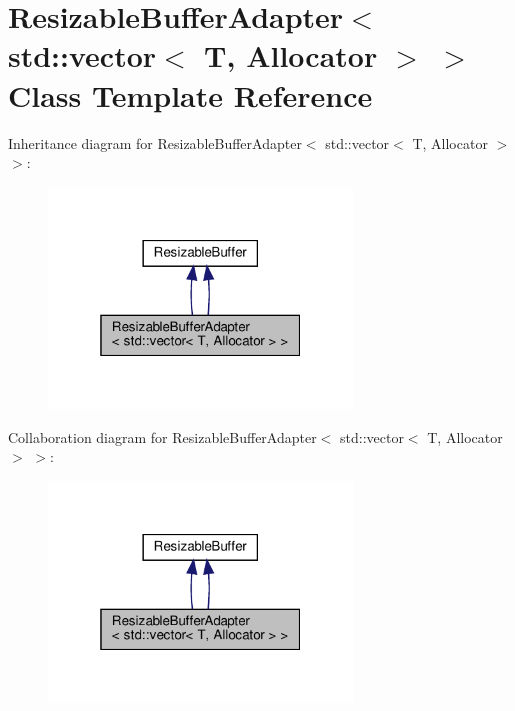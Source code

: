 \hypertarget{classResizableBufferAdapter_3_01std_1_1vector_3_01T_00_01Allocator_01_4_01_4}{}\section{Resizable\+Buffer\+Adapter$<$ std\+:\+:vector$<$ T, Allocator $>$ $>$ Class Template Reference}
\label{classResizableBufferAdapter_3_01std_1_1vector_3_01T_00_01Allocator_01_4_01_4}


Inheritance diagram for Resizable\+Buffer\+Adapter$<$ std\+:\+:vector$<$ T, Allocator $>$ $>$\+:
\nopagebreak
\begin{figure}[H]
\begin{center}
\leavevmode
\includegraphics[width=229pt]{classResizableBufferAdapter_3_01std_1_1vector_3_01T_00_01Allocator_01_4_01_4__inherit__graph}
\end{center}
\end{figure}


Collaboration diagram for Resizable\+Buffer\+Adapter$<$ std\+:\+:vector$<$ T, Allocator $>$ $>$\+:
\nopagebreak
\begin{figure}[H]
\begin{center}
\leavevmode
\includegraphics[width=229pt]{classResizableBufferAdapter_3_01std_1_1vector_3_01T_00_01Allocator_01_4_01_4__coll__graph}
\end{center}
\end{figure}
